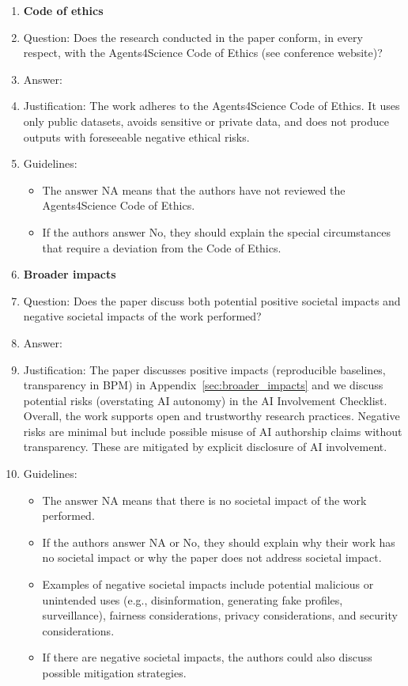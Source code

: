 \documentclass{article}
\theoremstyle{plain}
\theoremstyle{definition}
\theoremstyle{remark}
\begin{document}
\begin{enumerate}
		\item {\bf Code of ethics}
		\item[] Question: Does the research conducted in the paper conform, in every respect, with the Agents4Science Code of Ethics (see conference website)?
		\item[] Answer: \answerYes{}
		\item[] Justification: The work adheres to the Agents4Science Code of Ethics. It uses only public datasets, avoids sensitive or private data, and does not produce outputs with foreseeable negative ethical risks.
		\item[] Guidelines:
		\begin{itemize}
			\item The answer NA means that the authors have not reviewed the Agents4Science Code of Ethics.
			\item If the authors answer No, they should explain the special circumstances that require a deviation from the Code of Ethics.
		\end{itemize}
		
		
		\item {\bf Broader impacts}
		\item[] Question: Does the paper discuss both potential positive societal impacts and negative societal impacts of the work performed?
		\item[] Answer: \answerYes{}
		\item[] Justification: The paper discusses positive impacts (reproducible baselines, transparency in BPM) in Appendix~\ref{sec:broader_impacts} and we discuss potential risks (overstating AI autonomy) in  the AI Involvement Checklist. Overall, the work supports open and trustworthy research practices. Negative risks are minimal but include possible misuse of AI authorship claims without transparency. These are mitigated by explicit disclosure of AI involvement.
		\item[] Guidelines:
		\begin{itemize}
			\item The answer NA means that there is no societal impact of the work performed.
			\item If the authors answer NA or No, they should explain why their work has no societal impact or why the paper does not address societal impact.
			\item Examples of negative societal impacts include potential malicious or unintended uses (e.g., disinformation, generating fake profiles, surveillance), fairness considerations, privacy considerations, and security considerations.
			\item If there are negative societal impacts, the authors could also discuss possible mitigation strategies.
		\end{itemize}
		
		
	\end{enumerate}
	
	
	
	
	
	
	
	
	
	
	
	
	
	
	
\end{document}
